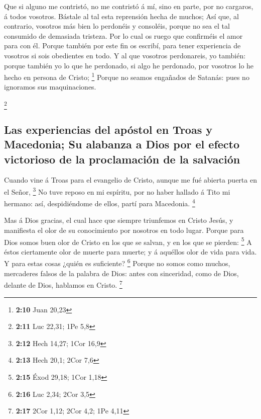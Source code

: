  Que si alguno me contristó, no me contristó á mí, sino en
parte, por no cargaros, á todos vosotros.  Bástale al tal
esta reprensión hecha de muchos;  Así que, al contrario,
vosotros más bien lo perdonéis y consoléis, porque no sea el tal
consumido de demasiada tristeza.  Por lo cual os ruego que
confirméis el amor para con él.  Porque también por este fin
os escribí, para tener experiencia de vosotros si sois obedientes en
todo.  Y al que vosotros perdonareis, yo también: porque
también yo lo que he perdonado, si algo he perdonado, por vosotros lo he
hecho en persona de Cristo; \footnote{\textbf{2:10} Juan 20,23}
 Porque no seamos engañados de Satanás: pues no ignoramos
sus maquinaciones.

\footnote{\textbf{2:11} Luc 22,31; 1Pe 5,8}

\hypertarget{las-experiencias-del-apuxf3stol-en-troas-y-macedonia-su-alabanza-a-dios-por-el-efecto-victorioso-de-la-proclamaciuxf3n-de-la-salvaciuxf3n}{%
\subsection{Las experiencias del apóstol en Troas y Macedonia; Su
alabanza a Dios por el efecto victorioso de la proclamación de la
salvación}\label{las-experiencias-del-apuxf3stol-en-troas-y-macedonia-su-alabanza-a-dios-por-el-efecto-victorioso-de-la-proclamaciuxf3n-de-la-salvaciuxf3n}}

 Cuando vine á Troas para el evangelio de Cristo, aunque me
fué abierta puerta en el Señor, \footnote{\textbf{2:12} Hech 14,27; 1Cor
  16,9}  No tuve reposo en mi espíritu, por no haber
hallado á Tito mi hermano: así, despidiéndome de ellos, partí para
Macedonia. \footnote{\textbf{2:13} Hech 20,1; 2Cor 7,6}

 Mas á Dios gracias, el cual hace que siempre triunfemos en
Cristo Jesús, y manifiesta el olor de su conocimiento por nosotros en
todo lugar.  Porque para Dios somos buen olor de Cristo en
los que se salvan, y en los que se pierden: \footnote{\textbf{2:15} Éxod
  29,18; 1Cor 1,18}  A éstos ciertamente olor de muerte
para muerte; y á aquéllos olor de vida para vida. Y para estas cosas
¿quién es suficiente? \footnote{\textbf{2:16} Luc 2,34; 2Cor 3,5}
 Porque no somos como muchos, mercaderes falsos de la
palabra de Dios: antes con sinceridad, como de Dios, delante de Dios,
hablamos en Cristo. \footnote{\textbf{2:17} 2Cor 1,12; 2Cor 4,2; 1Pe
  4,11}

